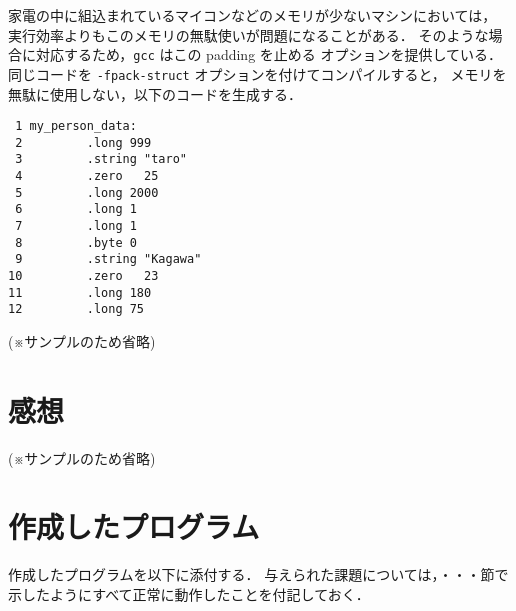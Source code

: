 \documentclass[a4j,11pt]{jarticle}
\begin{document}
家電の中に組込まれているマイコンなどのメモリが少ないマシンにおいては，
実行効率よりもこのメモリの無駄使いが問題になることがある．
そのような場合に対応するため，\verb|gcc| はこの padding を止める
オプションを提供している．
同じコードを \verb|-fpack-struct| オプションを付けてコンパイルすると，
メモリを無駄に使用しない，以下のコードを生成する．

{\fontsize{10pt}{11pt} \selectfont
\begin{verbatim}
 1 my_person_data:
 2         .long 999
 3         .string "taro"
 4         .zero   25
 5         .long 2000
 6         .long 1
 7         .long 1
 8         .byte 0
 9         .string "Kagawa"
10         .zero   23
11         .long 180
12         .long 75
\end{verbatim}
}

(※サンプルのため省略)

\section{感想}

(※サンプルのため省略)

\section{作成したプログラム}\label{sec:program}

作成したプログラムを以下に添付する．
与えられた課題については，・・・節で示したようにすべて正常に動作したことを付記しておく．
\end{document}
